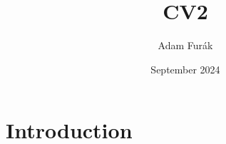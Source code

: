 \documentclass{article}
\title{CV2}
\author{Adam Furák}
\date{September 2024}
\begin{document}
\maketitle

\section{Introduction}
\end{document}
